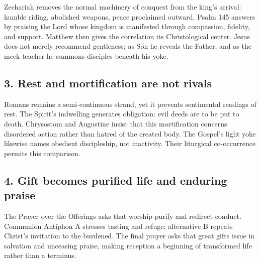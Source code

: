 Zechariah removes the normal machinery of conquest from the king's arrival: humble riding, abolished weapons, peace proclaimed outward. Psalm 145 answers by praising the Lord whose kingdom is manifested through compassion, fidelity, and support. Matthew then gives the correlation its Christological center. Jesus does not merely recommend gentleness; as Son he reveals the Father, and as the meek teacher he summons disciples beneath his yoke.

\subsection*{3. Rest and mortification are not rivals\enspace{}}

Romans remains a semi-continuous strand, yet it prevents sentimental readings of rest. The Spirit's indwelling generates obligation: evil deeds are to be put to death. Chrysostom and Augustine insist that this mortification concerns disordered action rather than hatred of the created body. The Gospel's light yoke likewise names obedient discipleship, not inactivity. Their liturgical co-occurrence permits this comparison.

\subsection*{4. Gift becomes purified life and enduring praise\enspace{}}

The Prayer over the Offerings asks that worship purify and redirect conduct. Communion Antiphon A stresses tasting and refuge; alternative B repeats Christ's invitation to the burdened. The final prayer asks that great gifts issue in salvation and unceasing praise, making reception a beginning of transformed life rather than a terminus.
